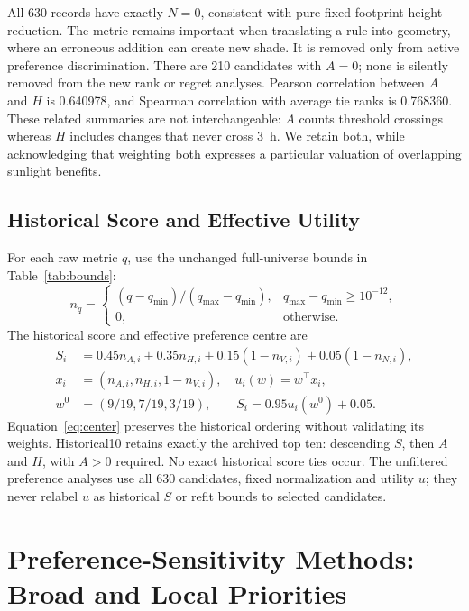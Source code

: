 \documentclass{llncs}
\begin{document}
All 630 records have exactly $N=0$, consistent with pure fixed-footprint height reduction. The metric remains important when translating a rule into geometry, where an erroneous addition can create new shade. It is removed only from active preference discrimination. There are 210 candidates with $A=0$; none is silently removed from the new rank or regret analyses. Pearson correlation between $A$ and $H$ is 0.640978, and Spearman correlation with average tie ranks is 0.768360. These related summaries are not interchangeable: $A$ counts threshold crossings whereas $H$ includes changes that never cross 3~h. We retain both, while acknowledging that weighting both expresses a particular valuation of overlapping sunlight benefits.

\subsection{Historical Score and Effective Utility}
For each raw metric $q$, use the unchanged full-universe bounds in Table~\ref{tab:bounds}:
\begin{equation}
 n_q=\begin{cases}(q-q_{\min})/(q_{\max}-q_{\min}),&q_{\max}-q_{\min}\geq10^{-12},\\0,&\text{otherwise}.\end{cases}
\label{eq:normalization}
\end{equation}
The historical score and effective preference centre are
\begin{align}
 S_i&=0.45n_{A,i}+0.35n_{H,i}+0.15(1-n_{V,i})+0.05(1-n_{N,i}),\label{eq:historical}\\
 x_i&=(n_{A,i},n_{H,i},1-n_{V,i}),\quad u_i(w)=w^\top x_i,\label{eq:utility}\\
 w^0&=(9/19,7/19,3/19),\qquad S_i=0.95u_i(w^0)+0.05.\label{eq:center}
\end{align}
Equation~\ref{eq:center} preserves the historical ordering without validating its weights. Historical10 retains exactly the archived top ten: descending $S$, then $A$ and $H$, with $A>0$ required. No exact historical score ties occur. The unfiltered preference analyses use all 630 candidates, fixed normalization and utility $u$; they never relabel $u$ as historical $S$ or refit bounds to selected candidates.

\section{Preference-Sensitivity Methods: Broad and Local Priorities}
\end{document}
